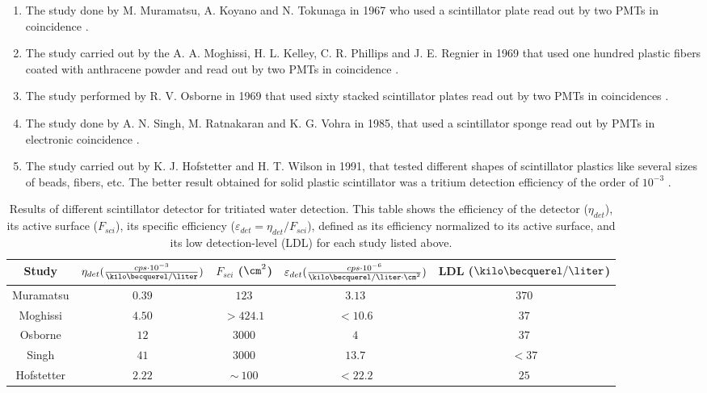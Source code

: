 \begin{enumerate}

\item{} The study done by M. Muramatsu, A. Koyano and N. Tokunaga in 1967 who used a scintillator plate read out by two PMTs in coincidence \cite{Muramatsu}.

\item{} The study carried out by the A. A. Moghissi, H. L. Kelley, C. R. Phillips and J. E. Regnier in 1969 that used one hundred plastic fibers coated with anthracene powder and read out by two PMTs in coincidence \cite{Moghissi}.

\item{} The study performed by R. V. Osborne in 1969 that used sixty stacked scintillator plates read out by two PMTs in coincidences \cite{Osborne}.

\item{} The study done by A. N. Singh, M. Ratnakaran and K. G. Vohra in 1985, that used a scintillator sponge read out by PMTs in electronic coincidence \cite{Ratnakaran, Ratnakaran2000}.

\item{} The study carried out by K. J. Hofstetter and H. T. Wilson in 1991, that tested different shapes of scintillator plastics like several sizes of beads, fibers, etc. The better result obtained for solid plastic scintillator was a tritium detection efficiency of the order of $10^{-3}$ \cite{Hofstetter1, Hofstetter2}.

\end{enumerate}
\begin{table}[htbp]
\begin{center}
\begin{tabular}{|c|c|c|c|c|}
\hline
Study & \parbox{5.5em}{\centering $\eta_{det}(\frac{cps \cdot{} 10^{-3}}{\kilo\becquerel/\liter})$}  & \parbox{4.5em}{\centering $F_{sci}$ ($\cm^2$)}  & \parbox{6.5em}{\centering $\varepsilon_{det}(\frac{cps \cdot{} 10^{-6}}{\kilo\becquerel/ \liter \cdot{} \cm^2})$} & LDL ($\kilo\becquerel / \liter$)\\
\hline \hline \hline
Muramatsu & $0.39$ & $123$ & $3.13$ & $370$ \\ \hline
Moghissi & $4.50$ & $>424.1$ & $<10.6$ & $37$ \\\hline
Osborne & $12$ & $3000$ & $4$ & $37$ \\ \hline
Singh & $41$ & $3000$ & $13.7$ & $<37$ \\ \hline
Hofstetter & $2.22$ & $\sim~100$ & $<22.2$ & $25$ \\ \hline
\end{tabular}
\caption{Results of different scintillator detector for tritiated water detection. This table shows the efficiency of the detector ($\eta_{det}$), its active surface ($F_{sci}$), its specific efficiency ($\varepsilon_{det}=\eta_{det}/F_{sci}$), defined as its efficiency normalized to its active surface, and its low detection-level (LDL) for each study listed above.}
\label{tab:PlasticScinTritium}
\end{center}
\end{table}

